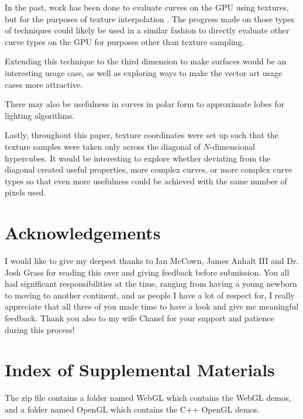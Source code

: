 \documentclass{jcgt}
\begin{document}
In the past, work has been done to evaluate curves on the GPU using textures, but for the purposes of texture interpolation \cite{doi:10.1080/2151237X.2008.10129269}.  The progress made on those types of techniques could likely be used in a similar fashion to directly evaluate other curve types on the GPU for purposes other than texture sampling.

Extending this technique to the third dimension to make surfaces would be an interesting usage case, as well as exploring ways to make the vector art usage cases more attractive.

There may also be usefulness in curves in polar form to approximate lobes for lighting algorithms.

Lastly, throughout this paper, texture coordinates were set up such that the texture samples were taken only across the diagonal of $N$-dimensional hypercubes.  It would be interesting to explore whether deviating from the diagonal created useful properties, more complex curves, or more complex curve types so that even more usefulness could be achieved with the same number of pixels used.

\section*{Acknowledgements}
\label{sec:acknowledgements}
I would like to give my deepest thanks to Ian McCown, James Anhalt III and Dr. Josh Grass for reading this over and giving feedback before submission.  You all had significant responsibilities at the time, ranging from having a young newborn to moving to another continent, and as people I have a lot of respect for, I really appreciate that all three of you made time to have a look and give me meaningful feedback.  Thank you also to my wife Chanel for your support and patience during this process!

\small



\section*{Index of Supplemental Materials}
\label{sec:indexofsupplementalmaterials}
The zip file contains a folder named WebGL which contains the WebGL demos, and a folder named OpenGL which contains the C++ OpenGL demos.
\end{document}
